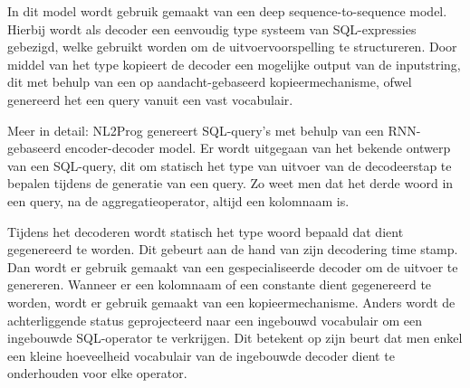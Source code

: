 In dit model wordt gebruik gemaakt van een deep sequence-to-sequence model. Hierbij wordt als decoder een eenvoudig type systeem van SQL-expressies gebezigd, welke gebruikt worden om de uitvoervoorspelling te structureren. Door middel van het type kopieert de decoder een mogelijke output van de inputstring, dit met behulp van een op aandacht-gebaseerd kopieermechanisme, ofwel genereerd het een query vanuit een vast vocabulair.

Meer in detail: NL2Prog genereert SQL-query’s met behulp van een RNN-gebaseerd encoder-decoder model. Er wordt uitgegaan van het bekende ontwerp van een SQL-query, dit om statisch het type van uitvoer van de decodeerstap te bepalen tijdens de generatie van een query. Zo weet men dat het derde woord in een query, na de aggregatieoperator, altijd een kolomnaam is. 

Tijdens het decoderen wordt statisch het type woord bepaald dat dient gegenereerd te worden. Dit gebeurt aan de hand van zijn decodering time stamp. Dan wordt er gebruik gemaakt van een gespecialiseerde decoder om de uitvoer te genereren. Wanneer er een kolomnaam of een constante dient gegenereerd te worden, wordt er gebruik gemaakt van een kopieermechanisme. Anders wordt de achterliggende status geprojecteerd naar een ingebouwd vocabulair om een ingebouwde SQL-operator te verkrijgen. Dit betekent op zijn beurt dat men enkel een kleine hoeveelheid vocabulair van de ingebouwde decoder dient te onderhouden voor elke operator.

